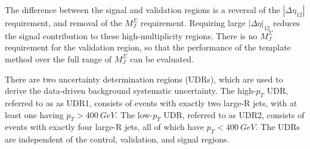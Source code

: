 The difference between the signal and validation regions is a reversal of the $|\Delta\eta_{12}|$ requirement, and removal of the $M_{J}^{\Sigma}$ requirement.
Requiring large $|\Delta\eta|_{12}$ reduces the signal contribution to these high-multiplicity regions.
There is no $M_{J}^{\Sigma}$ requirement for the validation region, so that the performance of the template method over the full range of $M_{J}^{\Sigma}$ can be evaluated.

There are two uncertainty determination regions (UDRs), which are used to derive the data-driven background systematic uncertainty.
The high-$p_{T}$ UDR, referred to as as UDR1, consists of events with exactly two large-R jets, with at least one having $p_{T}>400~GeV$.
The low-$p_{T}$ UDR, referred to as UDR2, consists of events with exactly four large-R jets, all of which have $p_{T}<400~GeV$.
The UDRs are independent of the control, validation, and signal regions.

